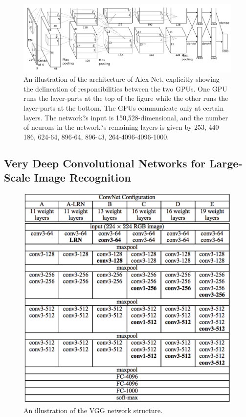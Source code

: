 \documentclass[a4paper,12pt]{article}
\begin{document}
 \begin{figure}[H]
  \begin{center}
      \includegraphics[scale=0.55]{alexnet.png}
\end{center}
\caption{An illustration of the architecture of Alex Net, explicitly showing the delineation of responsibilities between the two GPUs. One GPU runs the layer-parts at the top of the figure while the other runs the layer-parts at the bottom. The GPUs communicate only at certain layers. The network?s input is 150,528-dimensional, and the number of neurons in the network?s remaining layers is given by 253, 440-186, 624-64, 896-64, 896-43, 264-4096-4096-1000\cite{NIPS2012_4824}.}
 \label{fig:alexnet}
 \end{figure}

\subsection{Very Deep Convolutional Networks for Large-Scale Image Recognition\cite{SimonyanZ14a}}

 \begin{figure}[H]
  \begin{center}
      \includegraphics[scale=0.75]{vgg16.png}
\end{center}
\caption{An illustration of the VGG network structure.}
 \label{fig:vgg16}
 \end{figure}
\end{document}
